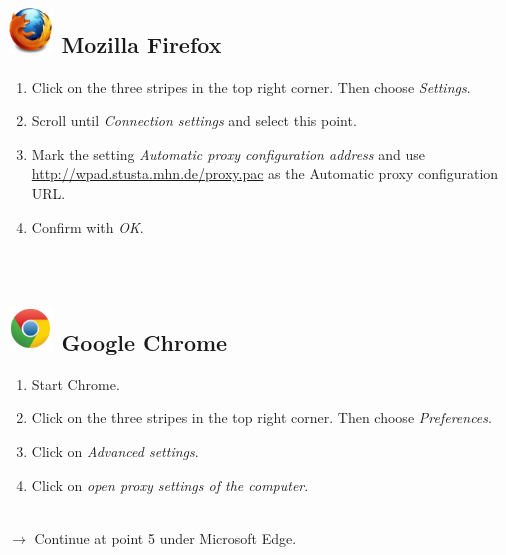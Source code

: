 \documentclass[a4paper,12pt]{scrartcl}
\begin{document}
\subsection*{\includegraphics[height=1.2cm,keepaspectratio]{Bilder/Firefox_35_logo} Mozilla Firefox}
\begin{enumerate}
	\item Click on the three stripes in the top right corner. Then choose \emph{Settings}.
	\item Scroll until \emph{Connection settings} and select this point.
	\item Mark the setting \emph{Automatic proxy configuration address} and use \\ \url{http://wpad.stusta.mhn.de/proxy.pac} as the Automatic proxy configuration URL.
	\item Confirm with \emph{OK}.\\
	\\
	\\
\end{enumerate}



\subsection*{\includegraphics[height=1.2cm,keepaspectratio]{Bilder/Chrome_2011_logo} Google Chrome}
\begin{enumerate}
	\item Start Chrome.
	\item Click on the three stripes in the top right corner. Then choose \emph{Preferences}.
	\item Click on \emph{Advanced settings}.
	\item Click on \emph{open proxy settings of the computer}.
	\\
	\\
\end{enumerate}
$\rightarrow$ Continue at point 5 under Microsoft Edge.
\end{document}
